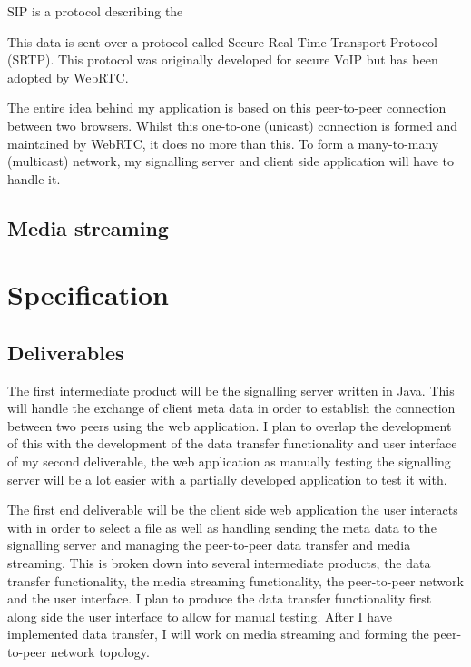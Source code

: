 \documentclass[]{report}
\begin{document}
			SIP is a protocol describing the 
				
			This data is sent over a protocol called Secure Real Time Transport Protocol (SRTP). This protocol was originally developed for secure VoIP but has been adopted by WebRTC. 
			
			The entire idea behind my application is based on this peer-to-peer connection between two browsers. Whilst this one-to-one (unicast) connection is formed and maintained by WebRTC, it does no more than this. To form a many-to-many (multicast) network, my signalling server and client side application will have to handle it.
		
		\subsection*{Media streaming}
			
	\section{Specification}
			\subsection*{Deliverables}
			The first intermediate product will be the signalling server written in Java. This will handle the exchange of client meta data in order to establish the connection between two peers using the web application. I plan to overlap the development of this with the development of the data transfer functionality and user interface of my second deliverable, the web application as manually testing the signalling server will be a lot easier with a partially developed application to test it with.
			
			The first end deliverable will be the client side web application the user interacts with in order to select a file as well as handling sending the meta data to the signalling server and managing the peer-to-peer data transfer and media streaming. This is broken down into several intermediate products, the data transfer functionality, the media streaming functionality, the peer-to-peer network and the user interface. I plan to produce the data transfer functionality first along side the user interface to allow for manual testing. After I have implemented data transfer, I will work on media streaming and forming the peer-to-peer network topology. 
			
\end{document}
